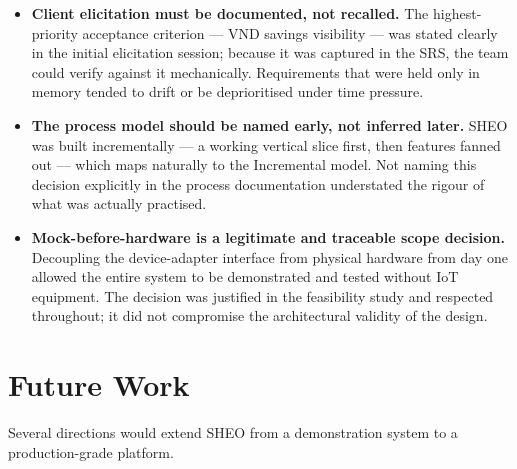 \begin{itemize}[leftmargin=1.5em, itemsep=4pt]
  \item \textbf{Client elicitation must be documented, not recalled.}
        The highest-priority acceptance criterion --- VND savings visibility ---
        was stated clearly in the initial elicitation session; because it was
        captured in the SRS, the team could verify against it mechanically.
        Requirements that were held only in memory tended to drift or be
        deprioritised under time pressure.

  \item \textbf{The process model should be named early, not inferred later.}
        SHEO was built incrementally --- a working vertical slice first, then
        features fanned out --- which maps naturally to the Incremental model.
        Not naming this decision explicitly in the process documentation
        understated the rigour of what was actually practised.

  \item \textbf{Mock-before-hardware is a legitimate and traceable scope decision.}
        Decoupling the device-adapter interface from physical hardware
        from day one allowed the entire system to be demonstrated and tested
        without IoT equipment.  The decision was justified in the feasibility
        study and respected throughout; it did not compromise the architectural
        validity of the design.

\end{itemize}

\section{Future Work}

Several directions would extend SHEO from a demonstration system to a
production-grade platform.

